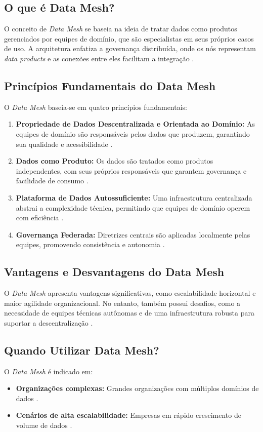 \subsection{O que é Data Mesh?}
O conceito de \textit{Data Mesh} se baseia na ideia de tratar dados como produtos gerenciados por equipes de domínio, que são especialistas em seus próprios casos de uso. A arquitetura enfatiza a governança distribuída, onde os nós representam \textit{data products} e as conexões entre eles facilitam a integração \cite{akhtar2021mesh}.

\subsection{Princípios Fundamentais do Data Mesh}
O \textit{Data Mesh} baseia-se em quatro princípios fundamentais:
\begin{enumerate}
    \item \textbf{Propriedade de Dados Descentralizada e Orientada ao Domínio:} As equipes de domínio são responsáveis pelos dados que produzem, garantindo sua qualidade e acessibilidade \cite{dehghani2020data}.
    \item \textbf{Dados como Produto:} Os dados são tratados como produtos independentes, com seus próprios responsáveis que garantem governança e facilidade de consumo \cite{dehghani2020data}.
    \item \textbf{Plataforma de Dados Autossuficiente:} Uma infraestrutura centralizada abstrai a complexidade técnica, permitindo que equipes de domínio operem com eficiência \cite{akhtar2021mesh}.
    \item \textbf{Governança Federada:} Diretrizes centrais são aplicadas localmente pelas equipes, promovendo consistência e autonomia \cite{martinez2022governance}.
\end{enumerate}

\subsection{Vantagens e Desvantagens do Data Mesh}
O \textit{Data Mesh} apresenta vantagens significativas, como escalabilidade horizontal e maior agilidade organizacional. No entanto, também possui desafios, como a necessidade de equipes técnicas autônomas e de uma infraestrutura robusta para suportar a descentralização \cite{johnson2021scaling}.

\subsection{Quando Utilizar Data Mesh?}
O \textit{Data Mesh} é indicado em:
\begin{itemize}
    \item \textbf{Organizações complexas:} Grandes organizações com múltiplos domínios de dados \cite{dehghani2020data}.
    \item \textbf{Cenários de alta escalabilidade:} Empresas em rápido crescimento de volume de dados \cite{martinez2022governance}.
\end{itemize}

